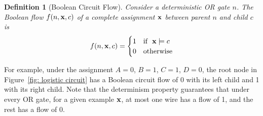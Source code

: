 \documentclass[letterpaper]{article} %
\newtheorem{definition}{Definition}
\begin{document}
\begin{definition}[Boolean Circuit Flow]
\label{definition: circuit flow}
Consider a deterministic OR gate $n$.
The Boolean flow $f(n,{\bf x},c)$ of a complete assignment $\bf x$ between parent $n$ and child $c$ is 
\begin{align*}
    f(n,{\bf x},c) = \begin{cases} 
    1 &\mbox{if~~} {\bf x} \models c \\ 
    0 & \mbox{otherwise} 
    \end{cases}
\end{align*}
\end{definition}
For example, under the assignment $A=0$, $B=1$, $C=1$, $D=0$, the root node in Figure~\ref{fig: logistic circuit} has a Boolean circuit flow of 0 with its left child and 1 with its right child.
Note that the determinism property guarantees that under every OR gate, for a given example ${\bf x}$, at most one wire has a flow of 1, and the rest has a flow of $0$. 
\end{document}
